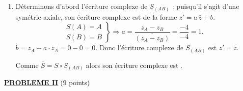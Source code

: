\begin{enumerate}
\begin{enumerate}
					\item {}
						D\'eterminons d'abord l'\'ecriture complexe de $S_{(AB)}$ :
						puisqu'il s'agit d'une sym\'etrie axiale, son \'ecriture complexe est de la forme $z' = a \, \bar{z} + b$.
						\[
							\left.
								\begin{array}{r}
									S(A) = A \\
									S(B) = B
								\end{array}
							\right\rbrace
							\Rightarrow
							a = \frac{z_A - z_B}{\overline{(z_A - z_B)}} = \frac{-4}{-4} = 1.
						\]
						$b = z_A - a \cdot \overline{z_A} = 0 - 0 = 0$.
						Donc l'\'ecriture complexe de $S_{(AB)}$ est $z' = \bar{z}$.
						
						Comme $\overline{S} = S \circ S_{(AB)}$ alors son \'ecriture complexe est .
				\end{enumerate}
		\end{enumerate}
\noindent \underline{\textsc{\textbf{PROBLEME II}}} (9 points) \newline
